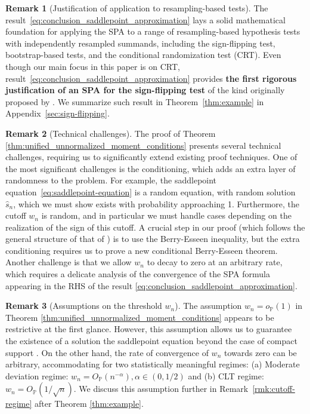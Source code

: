 \documentclass[12pt]{article}
\theoremstyle{definition}
\newtheorem{remark}{Remark}
\def\P{\mathbb{P}}
\def\P{\mathbb{P}}
\renewcommand{\P}{\mathbb{P}}							%
\begin{document}
  \begin{remark}[Justification of application to resampling-based tests]
	The result~\eqref{eq:conclusion_saddlepoint_approximation} lays a solid mathematical foundation for applying the SPA to a range of resampling-based hypothesis tests with independently resampled summands, including the sign-flipping test, bootstrap-based tests, and the conditional randomization test (CRT). Even though our main focus in this paper is on CRT, result~\eqref{eq:conclusion_saddlepoint_approximation} provides \textbf{the first rigorous justification of an SPA for the sign-flipping test} of the kind originally proposed by \citet{Daniels1955}. We summarize such result in Theorem~\ref{thm:example} in Appendix~\ref{sec:sign-flipping}. 
  \end{remark}
	
  \begin{remark}[Technical challenges]
	The proof of Theorem \ref{thm:unified_unnormalized_moment_conditions} presents several technical challenges, requiring us to significantly extend existing proof techniques. One of the most significant challenges is the conditioning, which adds an extra layer of randomness to the problem. For example, the saddlepoint equation~\eqref{eq:saddlepoint-equation} is a random equation, with random solution $\hat s_n$, which we must show exists with probability approaching 1. Furthermore, the cutoff $w_n$ is random, and in particular we must handle cases depending on the realization of the sign of this cutoff. A crucial step in our proof (which follows the general structure of that of \cite{Robinson1982}) is to use the Berry-Esseen inequality, but the extra conditioning requires us to prove a new conditional Berry-Esseen theorem. Another challenge is that we allow $w_n$ to decay to zero at an arbitrary rate, which requires a delicate analysis of the convergence of the SPA formula appearing in the RHS of the result \eqref{eq:conclusion_saddlepoint_approximation}. 
  \end{remark}
  
  \begin{remark}[Assumptions on the threshold $w_n$]
	The assumption $w_n=o_\P(1)$ in Theorem \ref{thm:unified_unnormalized_moment_conditions} appears to be restrictive at the first glance. However, this assumption allows us to guarantee the existence of a solution the saddlepoint equation beyond the case of compact support \citep{Daniels1954}. On the other hand, the rate of convergence of $w_n$ towards zero can be arbitrary, accommodating for two statistically meaningful regimes: (a) Moderate deviation regime: $w_n=O_{\P}(n^{-\alpha}),\alpha\in (0,1/2)$ and (b) CLT regime: $w_n=O_{\P}(1/\sqrt{n})$. We discuss this assumption further in Remark~\ref{rmk:cutoff-regime} after Theorem \ref{thm:example}.
  \end{remark}
  
\end{document}
